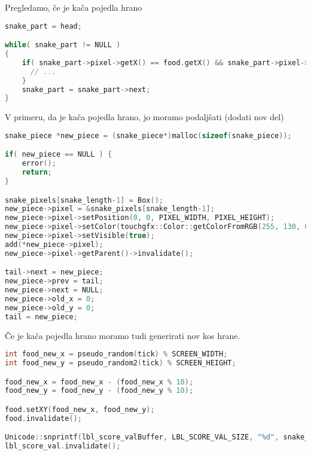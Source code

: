\documentclass{article}
\begin{document}
\noindent
Pregledamo, \v{c}e je ka\v{c}a pojedla hrano
\begin{lstlisting}[language=c++]
snake_part = head;

while( snake_part != NULL )
{
    if( snake_part->pixel->getX() == food.getX() && snake_part->pixel->getY() == food.getY() ) {
      // ...
    }
    snake_part = snake_part->next;
}
\end{lstlisting}

\noindent
V primeru, da je ka\v{c}a pojedla hrano, jo moramo podalj\v{s}ati (dodati
nov del)
\begin{lstlisting}[language=c++]
snake_piece *new_piece = (snake_piece*)malloc(sizeof(snake_piece));

if( new_piece == NULL ) {
    error();
    return;
}

snake_pixels[snake_length-1] = Box();
new_piece->pixel = &snake_pixels[snake_length-1];
new_piece->pixel->setPosition(0, 0, PIXEL_WIDTH, PIXEL_HEIGHT);
new_piece->pixel->setColor(touchgfx::Color::getColorFromRGB(255, 130, 0));
new_piece->pixel->setVisible(true);
add(*new_piece->pixel);
new_piece->pixel->getParent()->invalidate();

tail->next = new_piece;
new_piece->prev = tail;
new_piece->next = NULL;
new_piece->old_x = 0;
new_piece->old_y = 0;
tail = new_piece;
\end{lstlisting}

\noindent
\v{C}e je ka\v{c}a pojedla hrano moramo tudi generirati nov kos hrane.
\begin{lstlisting}[language=c++]
int food_new_x = pseudo_random(tick) % SCREEN_WIDTH;
int food_new_y = pseudo_random2(tick) % SCREEN_HEIGHT;

food_new_x = food_new_x - (food_new_x % 10);
food_new_y = food_new_y - (food_new_y % 10);

food.setXY(food_new_x, food_new_y);
food.invalidate();

Unicode::snprintf(lbl_score_valBuffer, LBL_SCORE_VAL_SIZE, "%d", snake_length);
lbl_score_val.invalidate();
\end{lstlisting}
\end{document}
